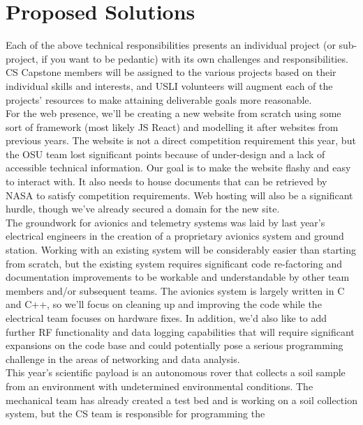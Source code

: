 \documentclass{IEEEtran}  %
\begin{document}
\section{Proposed Solutions}
\noindent  Each of the above technical responsibilities presents an
individual project (or sub-project, if you want to be pedantic)
with its own challenges and responsibilities. CS Capstone
members will be assigned to the various projects based on
their individual skills and interests, and USLI volunteers will
augment each of the projects’ resources to make attaining
deliverable goals more reasonable.
\newline
\\For the web presence, we’ll be creating a new website
from scratch using some sort of framework (most likely JS
React) and modelling it after websites from previous years.
The website is not a direct competition requirement this year,
but the OSU team lost significant points because of under-design
and a lack of accessible technical information. Our
goal is to make the website flashy and easy to interact with.
It also needs to house documents that can be retrieved by
NASA to satisfy competition requirements. Web hosting will
also be a significant hurdle, though we’ve already secured a
domain for the new site.
\newline
\\The groundwork for avionics and telemetry systems was
laid by last year’s electrical engineers in the creation of a
proprietary avionics system and ground station. Working with
an existing system will be considerably easier than starting
from scratch, but the existing system requires significant
code re-factoring and documentation improvements to be
workable and understandable by other team members and/or
subsequent teams. The avionics system is largely written in
C and C++, so we’ll focus on cleaning up and improving
the code while the electrical team focuses on hardware fixes.
In addition, we’d also like to add further RF functionality
and data logging capabilities that will require significant
expansions on the code base and could potentially pose a
serious programming challenge in the areas of networking
and data analysis.
\newline
\\This year’s scientific payload is an autonomous rover that
collects a soil sample from an environment with undetermined
environmental conditions. The mechanical team has
already created a test bed and is working on a soil collection
system, but the CS team is responsible for programming the
\end{document}
